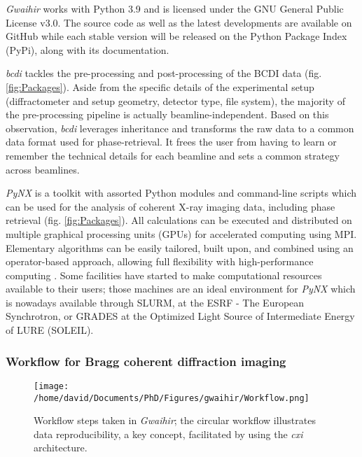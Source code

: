 \textit{Gwaihir} works with Python 3.9 and is licensed under the GNU General Public License v3.0.
The source code as well as the latest developments are available on GitHub while each stable version will be released on the Python Package Index (PyPi), along with its documentation.

\textit{bcdi} \parencite{jerome_carnis_2021_5741935} tackles the pre-processing and post-processing of the BCDI data (fig. \ref{fig:Packages}).
Aside from the specific details of the experimental setup (diffractometer and setup geometry, detector type, file system), the majority of the pre-processing pipeline is actually beamline-independent.
Based on this observation, \textit{bcdi} leverages inheritance and transforms the raw data to a common data format used for phase-retrieval.
It frees the user from having to learn or remember the technical details for each beamline and sets a common strategy across beamlines.

\textit{PyNX} \parencite{pynx2011} is a toolkit with assorted Python modules and command-line scripts which can be used for the analysis of coherent X-ray imaging data, including phase retrieval (fig. \ref{fig:Packages}).
All calculations can be executed and distributed on multiple graphical processing units (GPUs) for accelerated computing using MPI.
Elementary algorithms can be easily tailored, built upon, and combined using an operator-based approach, allowing full flexibility with high-performance computing \parencite{pynx2020operators}.
Some facilities have started to make computational resources available to their users; those machines are an ideal environment for \textit{PyNX} which is nowadays available through SLURM, at the ESRF - The European Synchrotron, or GRADES at the Optimized Light Source of Intermediate Energy of LURE (SOLEIL).

\subsubsection{Workflow for Bragg coherent diffraction imaging} \label{sec:Workflow}

\begin{figure}[!htb]
    \centering
    \texttt{[image: /home/david/Documents/PhD/Figures/gwaihir/Workflow.png]}
    \caption{Workflow steps taken in \textit{Gwaihir}; the circular workflow illustrates data reproducibility, a key concept, facilitated by using the \textit{cxi} architecture.}
    \label{fig:Workflow}
\end{figure}

